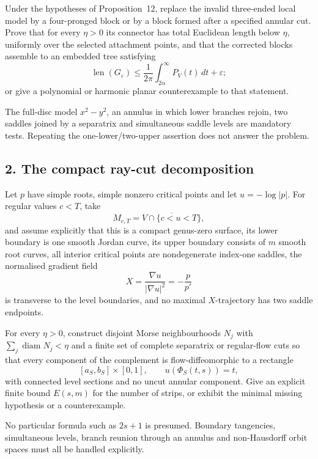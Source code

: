 \documentclass[11pt]{article}
\begin{document}
\begin{problem}\label{prob:saddle1041}
Under the hypotheses of Proposition~12, replace the invalid three-ended local
model by a four-pronged block or by a block formed after a specified annular
cut.  Prove that for every $\eta>0$ its connector has total Euclidean length
below $\eta$, uniformly over the selected attachment points, and that the
corrected blocks assemble to an embedded tree satisfying
\[
 \operatorname{len}(G_\varepsilon)
 \le\frac1{2\pi}\int_{2\alpha}^{\infty}P_V(t)\,dt+\varepsilon;
\]
or give a polynomial or harmonic planar counterexample to that statement.
\end{problem}

The full-disc model $x^2-y^2$, an annulus in which lower branches rejoin, two
saddles joined by a separatrix and simultaneous saddle levels are mandatory
tests.  Repeating the one-lower/two-upper assertion does not answer the
problem.

\subsection*{2. The compact ray-cut decomposition}

Let $p$ have simple roots, simple nonzero critical points and let
$u=-\log|p|$.  For regular values $c<T$, take
\[
 M_{c,T}=\overline{V\cap\{c<u<T\}},
\]
and assume explicitly that this is a compact genus-zero surface, its lower
boundary is one smooth Jordan curve, its upper boundary consists of $m$ smooth
root curves, all interior critical points are nondegenerate index-one saddles,
the normalised gradient field
\[
 X=\frac{\nabla u}{|\nabla u|^2}=-\frac{p}{p'}
\]
is transverse to the level boundaries, and no maximal $X$-trajectory has two
saddle endpoints.

\begin{problem}\label{prob:reeb1041}
For every $\eta>0$, construct disjoint Morse neighbourhoods $N_j$ with
$\sum_j\operatorname{diam}N_j<\eta$ and a finite set of complete separatrix or
regular-flow cuts so that every component of the complement is flow-diffeomorphic
to a rectangle
\[
 [a_S,b_S]\times[0,1],\qquad u(\Phi_S(t,s))=t,
\]
with connected level sections and no uncut annular component.  Give an explicit
finite bound $E(s,m)$ for the number of strips, or exhibit the minimal missing
hypothesis or a counterexample.
\end{problem}

No particular formula such as $2s+1$ is presumed.  Boundary tangencies,
simultaneous levels, branch reunion through an annulus and non-Hausdorff orbit
spaces must all be handled explicitly.
\end{document}
